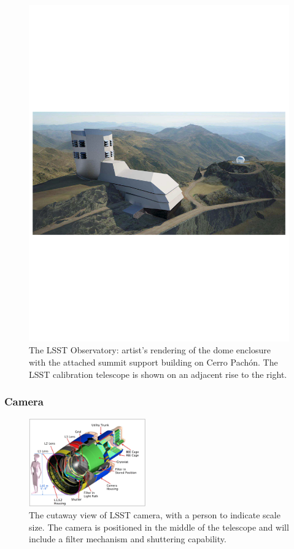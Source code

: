 \documentclass{emulateapj}
\begin{document}
\begin{figure}
\vskip -1.3in
\includegraphics[width=1.0\hsize,clip]{observatoryFull.pdf}
\vskip -1.4in
\caption{The LSST Observatory: artist's rendering of the dome enclosure 
with the attached summit support building on Cerro Pach\'{o}n. The LSST calibration 
telescope is shown on an adjacent rise to the right.} 
\label{Fig:observatory}
\end{figure}



\vskip 0.2in
\subsubsection{ Camera }


\begin{figure}[t!]
\includegraphics[width=0.45\textwidth]{camera2009.png}
\caption{The cutaway view of LSST camera, with a person to indicate scale size. 
The camera is positioned in the middle of the telescope and will include a filter 
mechanism and shuttering capability.} 
\label{Fig:camera}
\end{figure}
\end{document}
